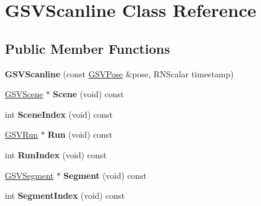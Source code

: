 \hypertarget{class_g_s_v_scanline}{}\section{G\+S\+V\+Scanline Class Reference}
\label{class_g_s_v_scanline}
\subsection*{Public Member Functions}
\begin{DoxyCompactItemize}
\item 
{\bfseries G\+S\+V\+Scanline} (const \hyperlink{class_g_s_v_pose}{G\+S\+V\+Pose} \&pose, R\+N\+Scalar timestamp)\hypertarget{class_g_s_v_scanline_a3b7c394a3a3430cee788d09f14599b93}{}\label{class_g_s_v_scanline_a3b7c394a3a3430cee788d09f14599b93}

\item 
\hyperlink{class_g_s_v_scene}{G\+S\+V\+Scene} $\ast$ {\bfseries Scene} (void) const \hypertarget{class_g_s_v_scanline_ac43a2764f2141c176d5f7644c62bb19e}{}\label{class_g_s_v_scanline_ac43a2764f2141c176d5f7644c62bb19e}

\item 
int {\bfseries Scene\+Index} (void) const \hypertarget{class_g_s_v_scanline_a2c05c6ff1b176ac6ea5a8c2a50b007f2}{}\label{class_g_s_v_scanline_a2c05c6ff1b176ac6ea5a8c2a50b007f2}

\item 
\hyperlink{class_g_s_v_run}{G\+S\+V\+Run} $\ast$ {\bfseries Run} (void) const \hypertarget{class_g_s_v_scanline_a52bbb2a29f4c374c18314df6040d3f93}{}\label{class_g_s_v_scanline_a52bbb2a29f4c374c18314df6040d3f93}

\item 
int {\bfseries Run\+Index} (void) const \hypertarget{class_g_s_v_scanline_a8d5321de05b233c943d55ee3b6319483}{}\label{class_g_s_v_scanline_a8d5321de05b233c943d55ee3b6319483}

\item 
\hyperlink{class_g_s_v_segment}{G\+S\+V\+Segment} $\ast$ {\bfseries Segment} (void) const \hypertarget{class_g_s_v_scanline_a5c6f7b762fb6d3641b71cca63b3fa403}{}\label{class_g_s_v_scanline_a5c6f7b762fb6d3641b71cca63b3fa403}

\item 
int {\bfseries Segment\+Index} (void) const \hypertarget{class_g_s_v_scanline_a8fc4e0e7b0e62ff8c25cf614ab9e3093}{}\label{class_g_s_v_scanline_a8fc4e0e7b0e62ff8c25cf614ab9e3093}


\end{DoxyCompactItemize}
